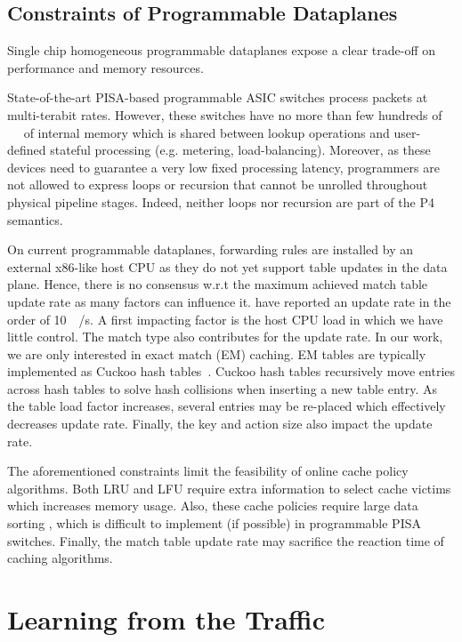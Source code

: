\subsection{Constraints of Programmable Dataplanes}

Single chip homogeneous programmable dataplanes expose a clear trade-off on performance and memory resources.

State-of-the-art PISA-based programmable ASIC switches process packets at multi-terabit rates.
However, these switches have no more than few hundreds of \SI{}{\mega\byte} of internal memory which is shared between lookup operations and user-defined stateful processing (e.g. metering, load-balancing).
Moreover, as these devices need to guarantee a very low fixed processing latency, programmers are not allowed to express loops or recursion that cannot be unrolled throughout physical pipeline stages.
Indeed, neither loops nor recursion are part of the P4 semantics.

On current programmable dataplanes, forwarding rules are installed by an external x86-like host CPU as they do not yet support table updates in the data plane.
Hence, there is no consensus w.r.t the maximum achieved match table update rate as many factors can influence it.
\citeauthor{Jin:2017} have reported an update rate in the order of \SI{10}{\kilo\update/\second}.
A first impacting factor is the host CPU load in which we have little control.
The match type also contributes for the update rate.
In our work, we are only interested in exact match (EM) caching. 
EM tables are typically implemented as Cuckoo hash tables~\cite{Kirsch:2009,Bosshart:14}.
Cuckoo hash tables recursively move entries across hash tables to solve hash collisions when inserting a new table entry.
As the table load factor increases, several entries may be re-placed which effectively decreases update rate.
Finally, the key and action size also impact the update rate.

The aforementioned constraints limit the feasibility of online cache policy algorithms.
Both LRU and LFU require extra information to select cache victims which increases memory usage.
Also, these cache policies require large data sorting , which is difficult to implement (if possible) in programmable PISA switches.
Finally, the match table update rate may sacrifice the reaction time of caching algorithms.

\section{Learning from the Traffic}\label{sec:traffic}

